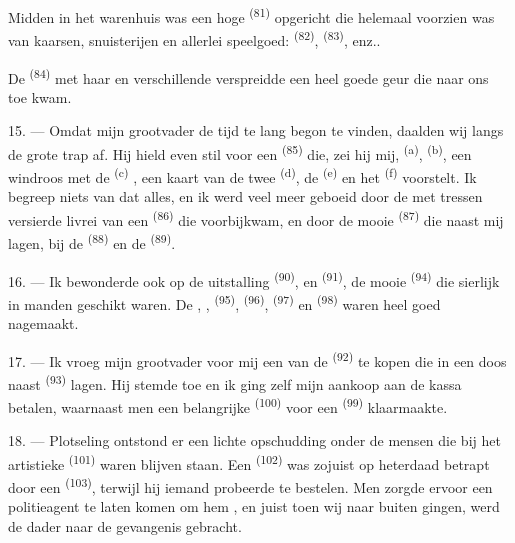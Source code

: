 Midden in het warenhuis was een hoge  \textsuperscript{(81)} opgericht die
helemaal voorzien was van kaarsen, snuisterijen en allerlei speelgoed: 
\textsuperscript{(82)},  \textsuperscript{(83)}, enz..

De  \textsuperscript{(84)} met haar  en verschillende
 verspreidde een heel goede geur die naar ons toe kwam.

\VUsaut{3.4mm}
\VUsaut{2.8mm}

15. --- Omdat mijn grootvader de tijd te lang begon te vinden, daalden wij langs de grote trap
af. Hij hield even stil voor een  \textsuperscript{(85)} die, zei
hij mij,  \textsuperscript{(a)}, 
\textsuperscript{(b)}, een windroos met de  \textsuperscript{(c)}
, een kaart van de twee
 \textsuperscript{(d)}, de 
\textsuperscript{(e)} en het  \textsuperscript{(f)} voorstelt. Ik begreep
niets van dat alles, en ik werd veel meer geboeid door de met tressen versierde livrei van een
 \textsuperscript{(86)} die voorbijkwam, en door de mooie 
\textsuperscript{(87)} die naast mij lagen, bij de 
\textsuperscript{(88)} en de
 \textsuperscript{(89)}.

16. --- Ik bewonderde ook op de uitstalling  \textsuperscript{(90)}, en
 \textsuperscript{(91)}, de mooie
 \textsuperscript{(94)} die sierlijk in manden geschikt
waren. De , ,  \textsuperscript{(95)},
 \textsuperscript{(96)},
 \textsuperscript{(97)} en 
\textsuperscript{(98)} waren heel goed nagemaakt.

\VUsaut{4.4mm}
\VUsaut{2.8mm}

17. --- Ik vroeg mijn grootvader voor mij een van de 
\textsuperscript{(92)} te kopen die in een doos naast 
\textsuperscript{(93)} lagen. Hij stemde toe en ik ging zelf mijn aankoop aan de kassa
betalen, waarnaast men een belangrijke  \textsuperscript{(100)} voor een
 \textsuperscript{(99)} klaarmaakte.

18. --- Plotseling ontstond er een lichte opschudding onder de mensen die bij het artistieke
 \textsuperscript{(101)} waren blijven staan. Een
 \textsuperscript{(102)} was zojuist op heterdaad betrapt door een
 \textsuperscript{(103)}, terwijl hij iemand probeerde te
bestelen. Men zorgde ervoor een politieagent te laten komen om hem
, en juist toen wij naar buiten gingen, werd de dader naar
de gevangenis gebracht.
\VUsaut{6.0mm}
\VUfilet{22mm}
